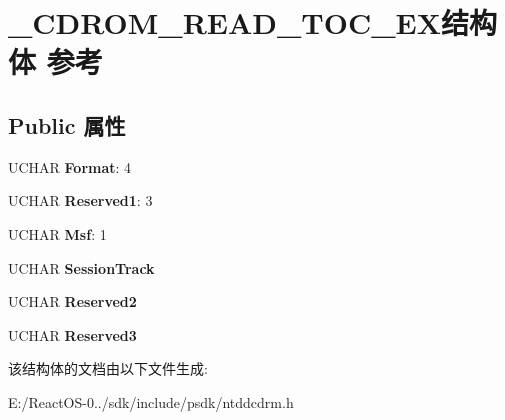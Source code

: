 \hypertarget{struct___c_d_r_o_m___r_e_a_d___t_o_c___e_x}{}\section{\+\_\+\+C\+D\+R\+O\+M\+\_\+\+R\+E\+A\+D\+\_\+\+T\+O\+C\+\_\+\+E\+X结构体 参考}
\label{struct___c_d_r_o_m___r_e_a_d___t_o_c___e_x}
\subsection*{Public 属性}
\begin{DoxyCompactItemize}
\item 
\mbox{\label{struct___c_d_r_o_m___r_e_a_d___t_o_c___e_x_a0e4975a7e99f82ea66f364881a84a0b4}} 
U\+C\+H\+AR {\bfseries Format}\+: 4
\item 
\mbox{\label{struct___c_d_r_o_m___r_e_a_d___t_o_c___e_x_afc9375e2a88d23136c0340a572560309}} 
U\+C\+H\+AR {\bfseries Reserved1}\+: 3
\item 
\mbox{\label{struct___c_d_r_o_m___r_e_a_d___t_o_c___e_x_a5b46383b567ab88d8c93ee3054b834a1}} 
U\+C\+H\+AR {\bfseries Msf}\+: 1
\item 
\mbox{\label{struct___c_d_r_o_m___r_e_a_d___t_o_c___e_x_a12524d1976291f14b5ccf01757648ab9}} 
U\+C\+H\+AR {\bfseries Session\+Track}
\item 
\mbox{\label{struct___c_d_r_o_m___r_e_a_d___t_o_c___e_x_a6a678d1351d41b621ace33d8b6171ea5}} 
U\+C\+H\+AR {\bfseries Reserved2}
\item 
\mbox{\label{struct___c_d_r_o_m___r_e_a_d___t_o_c___e_x_a3103f5d804611db2f4e3088f4cf261f7}} 
U\+C\+H\+AR {\bfseries Reserved3}
\end{DoxyCompactItemize}


该结构体的文档由以下文件生成\+:\begin{DoxyCompactItemize}
\item 
E\+:/\+React\+O\+S-\/0../sdk/include/psdk/ntddcdrm.\+h\end{DoxyCompactItemize}
